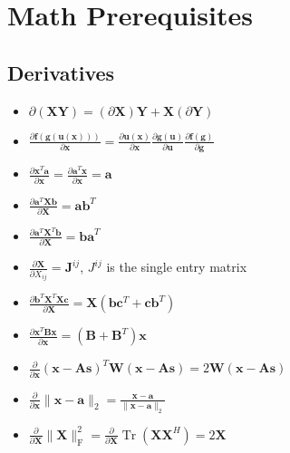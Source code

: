 
\section{Math Prerequisites}

\subsection{Derivatives }

\begin{itemize}
    \item $\partial ( \mathbf { X } \mathbf { Y } ) = ( \partial \mathbf { X } ) \mathbf { Y } + \mathbf { X } ( \partial \mathbf { Y } )$
    \item $\frac { \partial \mathbf { f } ( \mathbf { g } ( \mathbf { u } ( \mathbf { x } ) ) ) } { \partial \mathbf { x } } = \frac { \partial \mathbf { u } ( \mathbf { x } ) } { \partial \mathbf { x } } \frac { \partial \mathbf { g } ( \mathbf { u } ) } { \partial \mathbf { u } } \frac { \partial \mathbf { f } ( \mathbf { g } ) } { \partial \mathbf { g } }$
	\item $\frac { \partial \mathbf { x } ^ { T } \mathbf { a } } { \partial \mathbf { x } } = \frac { \partial \mathbf { a } ^ { T } \mathbf { x } } { \partial \mathbf { x } } = \mathbf { a }$
	\item $\frac { \partial \mathbf { a } ^ { T } \mathbf { X } \mathbf { b } } { \partial \mathbf { X } } = \mathbf { a b } ^ { T }$
	\item $\frac { \partial \mathbf { a } ^ { T } \mathbf { X } ^ { T } \mathbf { b } } { \partial \mathbf { X } } = \mathbf { b a } ^ { T }$
	\item $\frac { \partial \mathbf { X } } { \partial X _ { i j } } = \mathbf { J } ^ { i j }$, $J^{ij}$ is the single entry matrix
	\item $\frac { \partial \mathbf { b } ^ { T } \mathbf { X } ^ { T } \mathbf { X } \mathbf { c } } { \partial \mathbf { X } } = \mathbf { X } \left( \mathbf { b } \mathbf { c } ^ { T } + \mathbf { c b } ^ { T } \right)$
	\item $\frac { \partial \mathbf { x } ^ { T } \mathbf { B } \mathbf { x } } { \partial \mathbf { x } } = \left( \mathbf { B } + \mathbf { B } ^ { T } \right) \mathbf { x }$
	\item $\frac { \partial } { \partial \mathbf { x } } ( \mathbf { x } - \mathbf { A } \mathbf { s } ) ^ { T } \mathbf { W } ( \mathbf { x } - \mathbf { A } \mathbf { s } ) = 2 \mathbf { W } ( \mathbf { x } - \mathbf { A } \mathbf { s } )$
	\item $\frac { \partial } { \partial \mathbf { x } } \| \mathbf { x } - \mathbf { a } \| _ { 2 } = \frac { \mathbf { x } - \mathbf { a } } { \| \mathbf { x } - \mathbf { a } \| _ { 2 } }$
	\item $\frac { \partial } { \partial \mathbf { X } } \| \mathbf { X } \| _ { \mathrm { F } } ^ { 2 } = \frac { \partial } { \partial \mathbf { X } } \operatorname { Tr } \left( \mathbf { X } \mathbf { X } ^ { H } \right) = 2 \mathbf { X }$
\end{itemize}


